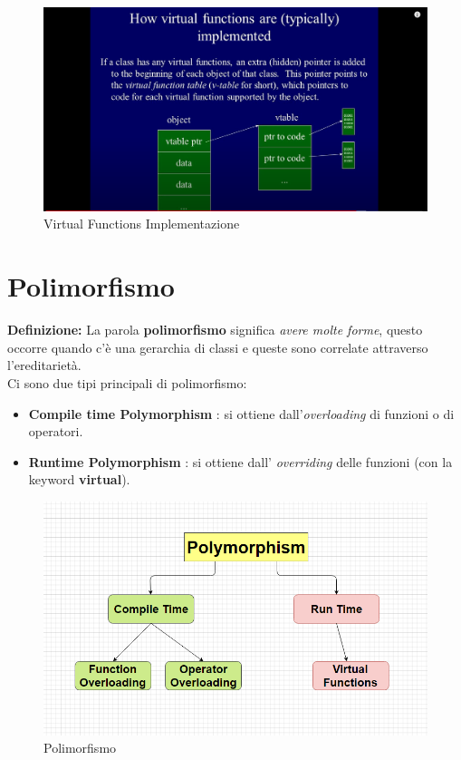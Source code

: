 \begin{figure}[H]
	\centering
	\includegraphics[width=1.2\textwidth, height=1.2\textheight, keepaspectratio]{./imgs/virtual_functions_implementation.png}
	\caption{Virtual Functions Implementazione}
	\label{fig:virtual_functions_implementation}
\end{figure}


\section{Polimorfismo}

\textsf{\small \textbf{Definizione:} La parola \textbf{polimorfismo} significa \emph{avere molte forme}, questo occorre quando c'è una gerarchia di classi e queste sono correlate attraverso l'ereditarietà.} \\

\textsf{\small Ci sono due tipi principali di polimorfismo: }

\begin{itemize}
	\item \textsf{\small \textbf{Compile time Polymorphism} : si ottiene dall'\emph{overloading} di funzioni o di operatori.}
	\item \textsf{\small \textbf{Runtime Polymorphism} : si ottiene dall' \emph{overriding} delle funzioni (con la keyword \textbf{virtual}).}
\end{itemize}

\begin{figure}[H]
	\centering
	\includegraphics[width=1\textwidth, height=1\textheight, keepaspectratio]{./imgs/polymorphism.png}
	\caption{Polimorfismo}
	\label{fig:polymorphism}
\end{figure}

